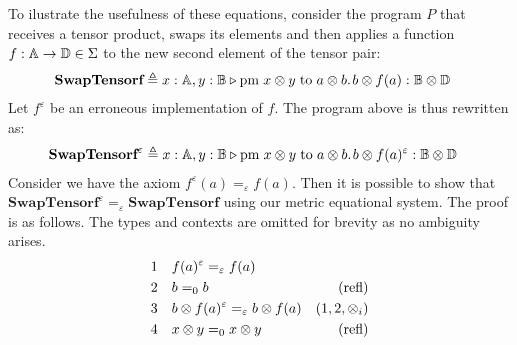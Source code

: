 \begin{example} \label{ex:metric_eqs}
  To ilustrate the usefulness of these equations, consider the program $P$ that receives a tensor product, swaps its elements and then applies a function $f: \mathbb{A} \to \mathbb{D} \in \Sigma $ to the new second element of the tensor pair:
\begin{equation*}
\begin{split}
& \textbf{SwapTensorf} \triangleq x : \mathbb{A},  y : \mathbb{B} \triangleright \text{pm} \hspace{3 pt} x \otimes y\hspace{3 pt} \text{to} \hspace{3 pt} a \otimes b. \hspace{1pt} b \otimes f(a) : \mathbb{B} \otimes \mathbb{D} &
\end{split}
\end{equation*}
Let $ f^{\varepsilon} $ be an erroneous implementation of $ f $. The program above is thus rewritten as:
\begin{equation*}
  \begin{split}
  & \textbf{SwapTensorf}^{\varepsilon} \triangleq  x : \mathbb{A},  y : \mathbb{B} \triangleright \text{pm} \hspace{3 pt} x \otimes y\hspace{3 pt} \text{to} \hspace{3 pt} a \otimes b. \hspace{1pt} b \otimes f(a)^{\varepsilon}  : \mathbb{B} \otimes \mathbb{D} &
  \end{split}
  \end{equation*}
Consider we  have the axiom $f^{\varepsilon}(a) =_{\varepsilon} f(a)$. Then it is possible to show that $\textbf{SwapTensorf}^{\varepsilon} =_{\varepsilon} \textbf{SwapTensorf} $ using our metric equational system. The proof is as follows. The types and contexts are omitted for brevity as no ambiguity arises.
\begin{equation*}
  \begin{split}
  1 \hspace{10 pt} & f(a)^{\varepsilon} =_{\varepsilon} f(a) \\
  2 \hspace{10 pt} &  b =_{0} b & {(\text{refl})} \\
  3 \hspace{10 pt} & b \otimes f(a)^{\varepsilon}  =_{\varepsilon} b \otimes f(a)  & \text{($1,2,\otimes_i$)} \\
  4 \hspace{10 pt} &   x \otimes y =_{0}  x \otimes y  &{(\text{refl})}  \\

\end{split}
\end{equation*}
\end{example}
